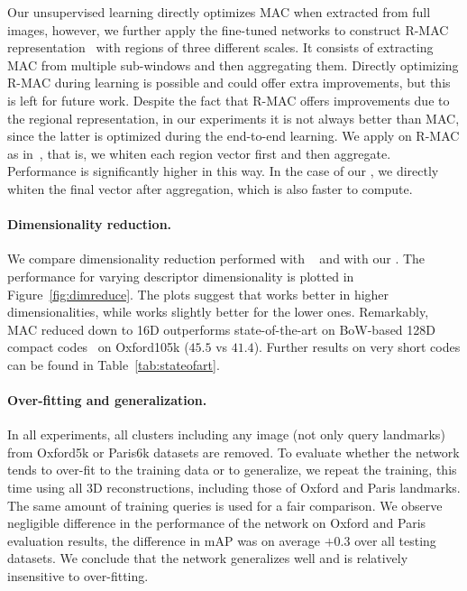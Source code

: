 Our unsupervised learning directly optimizes MAC when extracted from full images, however, we further apply the fine-tuned networks to construct R-MAC representation~\cite{TSJ16} with regions of three different scales.
It consists of extracting MAC from multiple sub-windows and then aggregating them. 
Directly optimizing R-MAC during learning is possible and could offer extra improvements, but this is left for future work. Despite the fact that R-MAC offers improvements due to the regional representation, in our experiments it is not always better than MAC, since the latter is optimized during the end-to-end learning.
We apply \pcawhiten on R-MAC as in~\cite{TSJ16}, that is, we whiten each region vector first and then aggregate. Performance is significantly higher in this way. In the case of our , we directly whiten the final vector after aggregation, which is also faster to compute.
%

%


\vspace{10pt}
\paragraph{Dimensionality reduction.}
%
We compare dimensionality reduction performed with \pcawhiten~\cite{JC12} and with our . The performance for varying descriptor dimensionality is plotted in Figure~\ref{fig:dimreduce}. The plots suggest that  works better in higher dimensionalities, while \pcawhiten works slightly better for the lower ones. Remarkably, MAC reduced down to 16D outperforms state-of-the-art on BoW-based 128D compact codes~\cite{RJC15} on Oxford105k ($45.5$ vs $41.4$). Further results on very short codes can be found in Table~\ref{tab:stateofart}. 

%

%

\vspace{10pt}
\paragraph{Over-fitting and generalization.}
%
In all experiments, all clusters including any image (not only query landmarks) from Oxford5k or Paris6k datasets are removed. 
To evaluate whether the network tends to over-fit to the training data or to generalize, we repeat the training, this time using all 3D reconstructions, including those of Oxford and Paris landmarks.
The same amount of training queries is used for a fair comparison.
We observe negligible difference in the performance of the network on Oxford and Paris evaluation results, \ie the difference in mAP was on average $+0.3$ over all testing datasets. 
We conclude that the network generalizes well and is relatively insensitive to over-fitting. 

